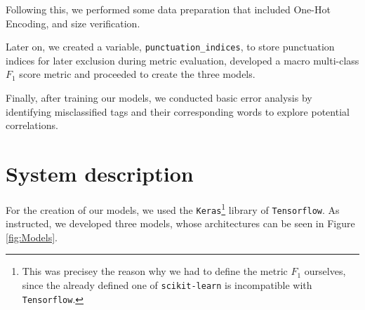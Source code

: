 \documentclass[11pt]{article}
\begin{document}
Following this, we performed some data preparation that included One-Hot Encoding, and size verification.

Later on, we created a variable, \texttt{punctuation\_indices}, to store punctuation indices for later exclusion during metric evaluation, developed a macro multi-class $F_1$ score metric and proceeded to create the three models.

Finally, after training our models, we conducted basic error analysis by identifying misclassified tags and their corresponding words to explore potential correlations.


\section{System description}
\label{sec:system}

For the creation of our models, we used the \texttt{Keras}\footnote{This was precisey the reason why we had to define the metric $F_1$ ourselves, since the already defined one of \texttt{scikit-learn} is incompatible with \texttt{Tensorflow}.} library of \texttt{Tensorflow}. As instructed, we developed three models, whose architectures can be seen in Figure \ref{fig:Models}.
\end{document}
